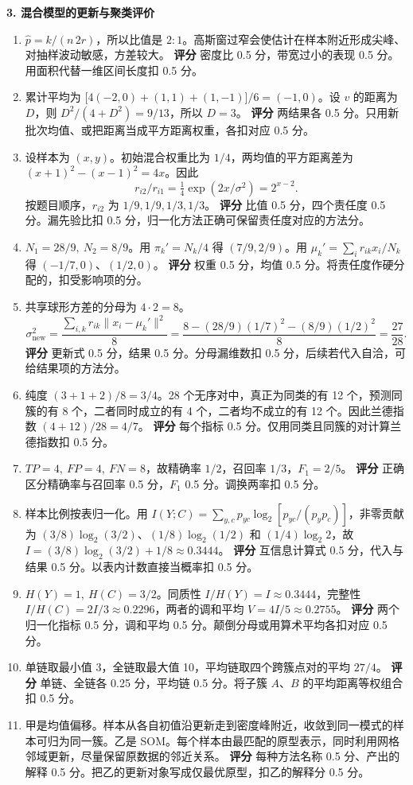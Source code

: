 \noindent\textbf{3. 混合模型的更新与聚类评价}
\begin{enumerate}[label=(\arabic*)]
\item $\widehat p=k/(n\,2r)$，所以比值是 $2:1$。高斯窗过窄会使估计在样本附近形成尖峰、对抽样波动敏感，方差较大。
\textbf{评分} 密度比 0.5 分，带宽过小的表现 0.5 分。用面积代替一维区间长度扣 0.5 分。
\item 累计平均为 $\bigl[4(-2,0)+(1,1)+(1,-1)\bigr]/6=(-1,0)$。设 $v$ 的距离为 $D$，则 $D^2/(4+D^2)=9/13$，所以 $D=3$。
\textbf{评分} 两结果各 0.5 分。只用新批次均值、或把距离当成平方距离权重，各扣对应 0.5 分。
\item 设样本为 $(x,y)$。初始混合权重比为 $1/4$，两均值的平方距离差为 $(x+1)^2-(x-1)^2=4x$。因此
\[
 r_{i2}/r_{i1}=\tfrac14\exp(2x/\sigma^2)=2^{x-2}.
\]
按题目顺序，$r_{i2}$ 为 $1/9,1/9,1/3,1/3$。
\textbf{评分} 比值 0.5 分，四个责任度 0.5 分。漏先验比扣 0.5 分，归一化方法正确可保留责任度对应的方法分。
\item $N_1=28/9,\ N_2=8/9$。用 $\pi_k'=N_k/4$ 得 $(7/9,2/9)$。用 $\mu_k'=\sum_i r_{ik}x_i/N_k$ 得 $(-1/7,0)$、$(1/2,0)$。
\textbf{评分} 权重 0.5 分，均值 0.5 分。将责任度作硬分配的，扣受影响项的分。
\item 共享球形方差的分母为 $4\cdot 2=8$。
\[
 \sigma_{\mathrm{new}}^2
 =\frac{\sum_{i,k}r_{ik}\|x_i-\mu_k'\|^2}{8}
 =\frac{8-(28/9)(1/7)^2-(8/9)(1/2)^2}{8}
 =\frac{27}{28}.
\]
\textbf{评分} 更新式 0.5 分，结果 0.5 分。分母漏维数扣 0.5 分，后续若代入自洽，可给结果项的方法分。
\item 纯度 $(3+1+2)/8=3/4$。28 个无序对中，真正为同类的有 12 个，预测同簇的有 8 个，二者同时成立的有 4 个，二者均不成立的有 12 个。因此兰德指数 $(4+12)/28=4/7$。
\textbf{评分} 每个指标 0.5 分。仅用同类且同簇的对计算兰德指数扣 0.5 分。
\item $TP=4,\ FP=4,\ FN=8$，故精确率 $1/2$，召回率 $1/3$，$F_1=2/5$。
\textbf{评分} 正确区分精确率与召回率 0.5 分，$F_1$ 0.5 分。调换两率扣 0.5 分。
\item 样本比例按表归一化。用 $I(Y;C)=\sum_{y,c}p_{yc}\log_2[p_{yc}/(p_y p_c)]$，非零贡献为 $(3/8)\log_2(3/2)$、$(1/8)\log_2(1/2)$ 和 $(1/4)\log_2 2$，故 $I=(3/8)\log_2(3/2)+1/8\approx0.3444$。
\textbf{评分} 互信息计算式 0.5 分，代入与结果 0.5 分。以表内计数直接当概率扣 0.5 分。
\item $H(Y)=1,\ H(C)=3/2$。同质性 $I/H(Y)=I\approx0.3444$，完整性 $I/H(C)=2I/3\approx0.2296$，两者的调和平均 $V=4I/5\approx0.2755$。
\textbf{评分} 两个归一化指标 0.5 分，调和平均 0.5 分。颠倒分母或用算术平均各扣对应 0.5 分。
\item 单链取最小值 3，全链取最大值 10，平均链取四个跨簇点对的平均 $27/4$。
\textbf{评分} 单链、全链各 0.25 分，平均链 0.5 分。将子簇 $A$、$B$ 的平均距离等权组合扣 0.5 分。
\item 甲是均值偏移。样本从各自初值沿更新走到密度峰附近，收敛到同一模式的样本可归为同一簇。乙是 SOM。每个样本由最匹配的原型表示，同时利用网格邻域更新，尽量保留原数据的邻近关系。
\textbf{评分} 每种方法名称 0.5 分、产出的解释 0.5 分。把乙的更新对象写成仅最优原型，扣乙的解释分 0.5 分。
\end{enumerate}

